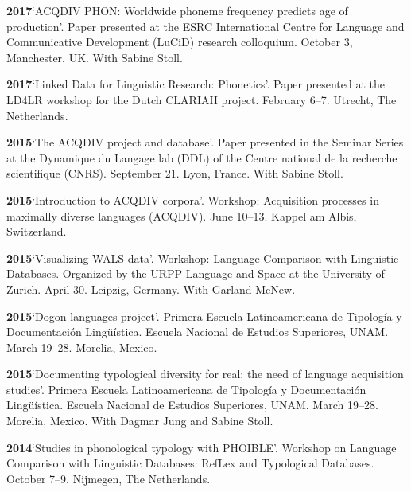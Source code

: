 \documentclass[11pt]{article}
\newcommand{\hangpara}{
 \setlength{\parindent}{0in} %
 \hangindent=0.42in %
}
\begin{document}
\vskip 6pt
\hangpara
{\bf 2017}\hspace{1ex}`ACQDIV PHON: Worldwide phoneme frequency predicts age of production'. Paper presented at the ESRC International Centre for Language and Communicative Development (LuCiD) research colloquium. October 3, Manchester, UK. With Sabine Stoll.

\vskip 6pt
\hangpara
{\bf 2017}\hspace{1ex}`Linked Data for Linguistic Research: Phonetics'. Paper presented at the LD4LR workshop for the Dutch CLARIAH project. February 6--7. Utrecht, The Netherlands. 

\vskip 6pt
\hangpara
{\bf 2015}\hspace{1ex}`The ACQDIV project and database'. Paper presented in the Seminar Series at the Dynamique du Langage lab (DDL) of the Centre national de la recherche scientifique (CNRS). September 21. Lyon, France. With Sabine Stoll.

\vskip 6pt
\hangpara
{\bf 2015}\hspace{1ex}`Introduction to ACQDIV corpora'. Workshop: Acquisition processes in maximally diverse languages (ACQDIV). June 10--13. Kappel am Albis, Switzerland.

\vskip 6pt
\hangpara
{\bf 2015}\hspace{1ex}`Visualizing WALS data'. Workshop: Language Comparison with Linguistic Databases. Organized by the URPP Language and Space at the University of Zurich. April 30. Leipzig, Germany. With Garland McNew.


\vskip 6pt
\hangpara
{\bf 2015}\hspace{1ex}`Dogon languages project'. Primera Escuela Latinoamericana de Tipolog{\'i}a y Documentaci{\'o}n Ling{\"u}{\'i}stica. Escuela Nacional de Estudios Superiores, UNAM. March 19--28. Morelia, Mexico.

\vskip 6pt
\hangpara
{\bf 2015}\hspace{1ex}`Documenting typological diversity for real: the need of language acquisition studies'. Primera Escuela Latinoamericana de Tipolog{\'i}a y Documentaci{\'o}n Ling{\"u}{\'i}stica. Escuela Nacional de Estudios Superiores, UNAM. March 19--28. Morelia, Mexico. With Dagmar Jung and Sabine Stoll.

\vskip 6pt
\hangpara
{\bf 2014}\hspace{1ex}`Studies in phonological typology with PHOIBLE'. Workshop on Language Comparison with Linguistic Databases: RefLex and Typological Databases. October 7--9. Nijmegen, The Netherlands.
\end{document}
